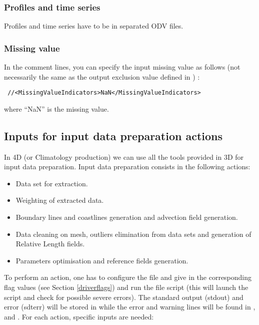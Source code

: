 \subsubsection{Profiles and time series}

Profiles and time series have to be in separated ODV files.

\subsubsection{Missing value}

In the comment lines, you can specify the input missing value as follows (not necessarily the same as the output exclusion value defined 
in ) :

\begin{verbatim}
 //<MissingValueIndicators>NaN</MissingValueIndicators>
\end{verbatim}

where ``NaN'' is the missing value.

\subsection{Inputs for input data preparation actions}

In \diva 4D (or Climatology production) we can use all the tools provided in \diva 3D for input data preparation.
Input data preparation consists in the following actions:

\vspace{-0.5cm}

\begin{itemize}
\item Data set for extraction.
\item Weighting of extracted data.
\item Boundary lines and coastlines generation and advection field generation.
\item Data cleaning on mesh, outliers elimination from data sets and generation of Relative Length fields.
\item Parameters optimisation and reference fields generation.
\end{itemize}


To perform an action, one has to configure the  file and give in the corresponding flag values (see Section \ref{driverflags}) and run the
 file script (this will launch the  script and check for possible severe errors). 
The standard output (stdout) and error (sdterr) will be stored in  while the error and warning lines will be found in 
,  and .
For each action, specific inputs are needed:


